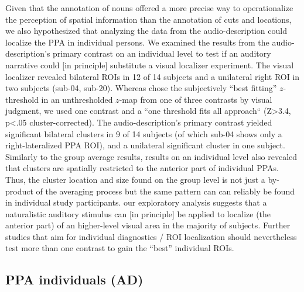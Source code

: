 \documentclass[english]{article}
\begin{document}
%
Given that the annotation of nouns offered a more precise way to operationalize
the perception of spatial information than the annotation of cuts and locations,
we also hypothesized that analyzing the data from the audio-description could
localize the PPA in individual persons.
%
We examined the results from the audio-description's primary contrast on an
individual level to test if an auditory narrative could [in principle]
substitute a visual localizer experiment.
The visual localizer \citep{sengupta2016extension} revealed bilateral ROIs in 12
of 14 subjects and a unilateral right ROI in two subjects (sub-04, sub-20).
%
Whereas \citep{sengupta2016extension} chose the subjectively ``best fitting''
$z$-threshold in an unthresholded $z$-map from one of three contrasts by visual
judgment, we used one contrast and a ``one threshold fits all approach`` (Z>3.4,
p<.05 cluster-corrected).
The audio-description's primary contrast yielded significant bilateral clusters
in 9 of 14 subjects (of which sub-04 shows only a right-lateralized PPA ROI),
and a unilateral significant cluster in one subject.
Similarly to the group average results, results on an individual level also
revealed that clusters are spatially restricted to the anterior part of
individual PPAs.
Thus, the cluster location and size found on the group level is not just a
by-product of the averaging process but the same pattern can can reliably be
found in individual study participants.
our exploratory analysis suggests that a naturalistic auditory stimulus
can [in principle] be applied to localize (the anterior part) of an higher-level
visual area in the majority of subjects.
Further studies that aim for individual diagnostics / ROI localization should
nevertheless test more than one contrast to gain the ``best'' individual
ROIs.



\subsection{PPA individuals (AD)}
\end{document}
